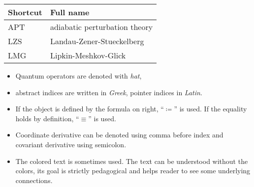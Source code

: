 \begin{tabular} {@{}C{4cm}@{}p{9.67cm}}
	\toprule
	\textbf{Shortcut}& \textbf{Full name}\\\bottomrule
	
	APT & adiabatic perturbation theory \\
	LZS & Landau-Zener-Stueckelberg\\
	LMG & Lipkin-Meshkov-Glick \\
	\bottomrule
\end{tabular}


\begin{itemize}
	\item Quantum operators are denoted with \emph{hat}, 
	\item abstract indices are written in \emph{Greek}, pointer indices in \emph{Latin}. 
	\item If the object is defined by the formula on right, “$\coloneqq$” is used. If the equality holds by definition, “$\equiv$” is used. 
	\item Coordinate derivative can be denoted using comma before index and covariant derivative using semicolon. 
	\item The colored text is sometimes used. The text can be understood without the colors, its goal is strictly pedagogical and helps reader to see some underlying connections.
\end{itemize}